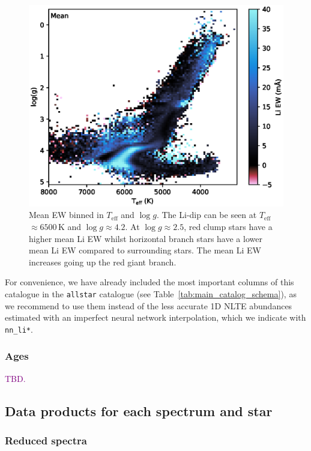 \documentclass[
  journal=pasa,
  manuscript=research-paper, %
  year=2024,
  volume=37
]{cup-journal}
\newcommand{\SB}[1]{{\textcolor{purple}{#1}}}
\newcommand{\Teff}{$T_\mathrm{eff}$\xspace}
\newcommand{\logg}{$\log g$\xspace}
\begin{document}
\begin{figure}[ht]
\includegraphics[width=\columnwidth]{figures/mean_ew.eps}
\caption{
Mean EW binned in \Teff and \logg. The Li-dip can be seen at \Teff$\approx 6500$\,K and \logg$\approx 4.2$. At \logg$\approx 2.5$, red clump stars have a higher mean Li EW whilst horizontal branch stars have a lower mean Li EW compared to surrounding stars. The mean Li EW increases going up the red giant branch. 
}
\label{fig:mean_ew}
\end{figure}

For convenience, we have already included the most important columns of this catalogue in the \texttt{allstar} catalogue (see Table~\ref{tab:main_catalog_schema}), as we recommend to use them instead of the less accurate 1D NLTE abundances estimated with an imperfect neural network interpolation, which we indicate with \texttt{nn\_li*}.

\subsubsection{Ages}

\SB{TBD.}

\subsection{Data products for each spectrum and star}
\label{sec:data_products_for_each_spectrum}

\subsubsection{Reduced spectra} \label{sec:reduced_spectra}
\end{document}
